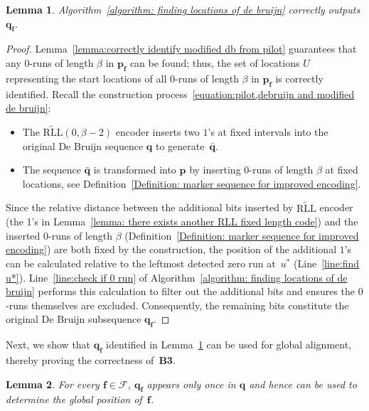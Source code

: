 \documentclass[journal,letterpaper,onecolumn,11pt]{IEEEtran}
\newcommand{\cF}{\mathcal{F}}
\newcommand{\boldf}{\mathbf{f}}
\newcommand{\boldq}{\mathbf{q}}
\newtheorem{lemma}{Lemma}
\begin{document}
\begin{lemma}\label{lemma: modified de brujin sequence can be decode}
    Algorithm~\ref{algorithm: finding locations of de bruijn} correctly outputs $\mathbf{q}_{\boldf}$.
\end{lemma}
\begin{proof}
    Lemma~\ref{lemma:correctly identify modified db from pilot} guarantees that any $0$-runs of length $\beta$  in $\mathbf{p}_{\boldf}$ can be found; thus, the set of locations $U$ representing the start locations of all $0$-runs of length $\beta$ in $\mathbf{p}_{\boldf}$ is correctly identified.    
    Recall the construction process~\eqref{equation:pilot,debruijn and modified de bruijn}: 
    \begin{itemize}
        \item The $\widetilde{\mathrm{RLL}}(0,\beta-2)$ encoder inserts two $1$'s at fixed intervals into the original De Bruijn sequence $\mathbf{q}$ to generate~$\bar{\mathbf{q}}$.
        \item The sequence $\bar{\mathbf{q}}$ is transformed into $\mathbf{p}$ by inserting $0$-runs of length $\beta$ at fixed locations, see Definition~\ref{Definition: marker sequence for improved encoding}.
    \end{itemize}
    
    Since the relative distance between the additional bits inserted by $\widetilde{\mathrm{RLL}}$ encoder (the 1's in Lemma~\ref{lemma: there exists another RLL fixed length code}) and the inserted $0$-runs of length $\beta$ (Definition~\ref{Definition: marker sequence for improved encoding}) are both fixed by the construction, the position of the additional $1$'s can be calculated relative to the leftmost detected zero run at~$u^*$ (Line~\ref{line:find u*}). 
    Line~\ref{line:check if 0 run} of Algorithm~\ref{algorithm: finding locations of de bruijn} performs this calculation to filter out the additional bits and ensures the $0$-runs themselves are excluded. Consequently, the remaining bits constitute the original De Bruijn subsequence $\boldq_\boldf$.
\end{proof}
Next, we show that $\mathbf{q}_{\boldf}$ identified in Lemma~\ref{lemma: modified de brujin sequence can be decode} can be used for global alignment, thereby proving the correctness of~\textbf{B3}.
\begin{lemma}\label{lemma:global alignment for qN}
    For every $\boldf\in \cF$, $\mathbf{q}_{\boldf}$ appears only once in $\boldq$ and hence can be used to determine the global position of~$\boldf$.
\end{lemma}
\end{document}
